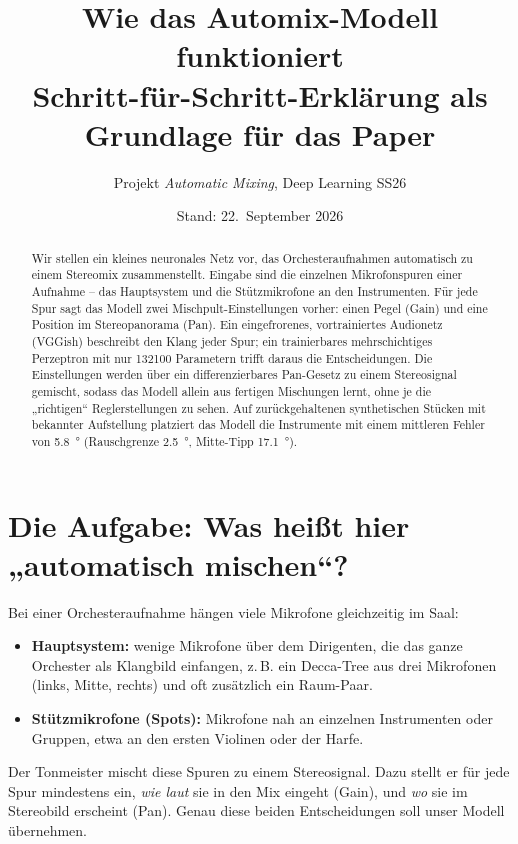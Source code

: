 \documentclass[11pt,a4paper]{article}
\title{\textbf{Wie das Automix-Modell funktioniert}\\[0.3em]
\large Schritt-für-Schritt-Erklärung als Grundlage für das Paper}
\author{Projekt \emph{Automatic Mixing}, Deep Learning SS26}
\date{Stand: 22.~September 2026}
\begin{document}
\maketitle

\begin{abstract}
\noindent Wir stellen ein kleines neuronales Netz vor, das Orchesteraufnahmen
automatisch zu einem Stereomix zusammenstellt. Eingabe sind die einzelnen
Mikrofonspuren einer Aufnahme -- das Hauptsystem und die Stützmikrofone an
den Instrumenten. Für jede Spur sagt das Modell zwei Mischpult-Einstellungen
vorher: einen Pegel (Gain) und eine Position im Stereopanorama (Pan). Ein
eingefrorenes, vortrainiertes Audionetz (VGGish) beschreibt den Klang jeder
Spur; ein trainierbares mehrschichtiges Perzeptron mit nur \num{132100}
Parametern trifft daraus die Entscheidungen. Die Einstellungen werden über
ein differenzierbares Pan-Gesetz zu einem Stereosignal gemischt, sodass das
Modell allein aus fertigen Mischungen lernt, ohne je die „richtigen“
Reglerstellungen zu sehen. Auf zurückgehaltenen synthetischen Stücken mit
bekannter Aufstellung platziert das Modell die Instrumente mit einem mittleren
Fehler von \SI{5.8}{\degree} (Rauschgrenze \SI{2.5}{\degree}, Mitte-Tipp
\SI{17.1}{\degree}).
\end{abstract}

\tableofcontents
\bigskip

\section{Die Aufgabe: Was heißt hier „automatisch mischen“?}

Bei einer Orchesteraufnahme hängen viele Mikrofone gleichzeitig im Saal:
\begin{itemize}[nosep]
  \item \textbf{Hauptsystem:} wenige Mikrofone über dem Dirigenten, die das
    ganze Orchester als Klangbild einfangen, z.\,B. ein Decca-Tree aus drei
    Mikrofonen (links, Mitte, rechts) und oft zusätzlich ein Raum-Paar.
  \item \textbf{Stützmikrofone (Spots):} Mikrofone nah an einzelnen
    Instrumenten oder Gruppen, etwa an den ersten Violinen oder der Harfe.
\end{itemize}
Der Tonmeister mischt diese Spuren zu einem Stereosignal. Dazu stellt er für
jede Spur mindestens ein, \emph{wie laut} sie in den Mix eingeht (Gain), und
\emph{wo} sie im Stereobild erscheint (Pan). Genau diese beiden Entscheidungen
soll unser Modell übernehmen.
\end{document}
